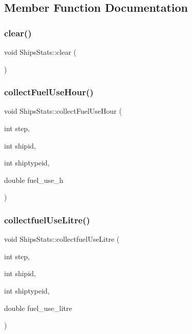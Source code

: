 \subsection{Member Function Documentation}
\mbox{\label{class_ships_stats_a7a9b1f34b774297af6384ce11b999a0f}} 
\subsubsection{\texorpdfstring{clear()}{clear()}}
{\footnotesize\ttfamily void Ships\+Stats\+::clear (\begin{DoxyParamCaption}{ }\end{DoxyParamCaption})}

\mbox{\label{class_ships_stats_a07fc97c3b7b4686e8cebd18c546f589f}} 
\subsubsection{\texorpdfstring{collectFuelUseHour()}{collectFuelUseHour()}}
{\footnotesize\ttfamily void Ships\+Stats\+::collect\+Fuel\+Use\+Hour (\begin{DoxyParamCaption}\item[{int}]{step,  }\item[{int}]{shipid,  }\item[{int}]{shiptypeid,  }\item[{double}]{fuel\+\_\+use\+\_\+h }\end{DoxyParamCaption})}

\mbox{\label{class_ships_stats_af66de819dc88837e1aaee09d91899296}} 
\subsubsection{\texorpdfstring{collectfuelUseLitre()}{collectfuelUseLitre()}}
{\footnotesize\ttfamily void Ships\+Stats\+::collectfuel\+Use\+Litre (\begin{DoxyParamCaption}\item[{int}]{step,  }\item[{int}]{shipid,  }\item[{int}]{shiptypeid,  }\item[{double}]{fuel\+\_\+use\+\_\+litre }\end{DoxyParamCaption})}

